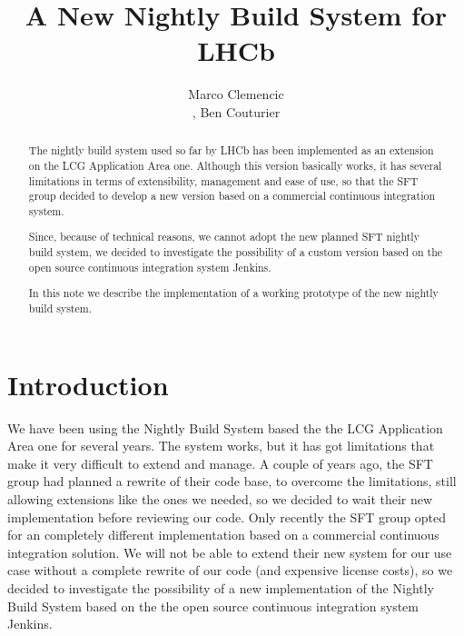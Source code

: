 \documentclass{lhcbnote}
\title{A New Nightly Build System for LHCb}
\author{Marco Clemencic\address[CERN]{CERN, Switzerland},
        Ben Couturier\addressmark[CERN]}
\begin{document}
\maketitle

\begin{abstract}
The nightly build system used so far by LHCb has been implemented as an
extension on the LCG Application Area one\cite{Kruzelecki:2010zz}.  Although
this version basically works, it has several limitations in terms of
extensibility, management and ease of use, so that the SFT group decided to
develop a new version based on a commercial continuous integration system.

Since, because of technical reasons, we cannot adopt the new planned SFT nightly
build system, we decided to investigate the possibility of a custom version
based on the open source continuous integration system Jenkins\cite{Jenkins}.

In this note we describe the implementation of a working prototype of the new
nightly build system.
\end{abstract}

\begin{status}
\end{status}

\tableofcontents

\listoffigures

\section{Introduction}
We have been using the Nightly Build System based the the LCG Application Area
one for several years\cite{Kruzelecki:2010zz}.  The system works, but it has got
limitations that make it very difficult to extend and manage.  A couple of years
ago, the SFT group had planned a rewrite of their code base, to overcome the
limitations, still allowing extensions like the ones we needed, so we decided to
wait their new implementation before reviewing our code.  Only recently the SFT
group opted for an completely different implementation based on a commercial
continuous integration solution.  We will not be able to extend their new system
for our use case without a complete rewrite of our code (and expensive license
costs), so we decided to investigate the possibility of a new implementation of
the Nightly Build System based on the the open source continuous integration
system Jenkins\cite{Jenkins}.
\end{document}
